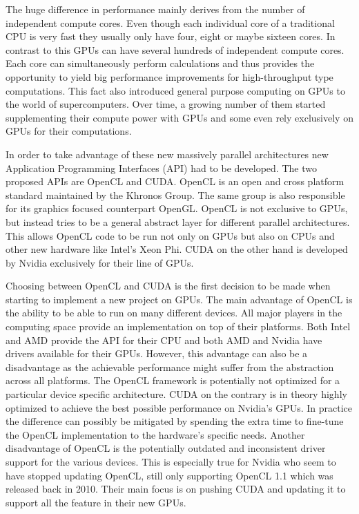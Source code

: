 \documentclass[a4paper,11pt]{kth-mag}
\begin{document}
The huge difference in performance mainly derives from the number of independent compute cores. Even though each individual core of a traditional CPU is very fast they usually only have four, eight or maybe sixteen cores. In contrast to this GPUs can have several hundreds of independent compute cores. Each core can simultaneously perform calculations and thus provides the opportunity to yield big performance improvements for high-throughput type computations. This fact also introduced general purpose computing on GPUs to the world of supercomputers. Over time, a growing number of them started supplementing their compute power with GPUs and some even rely exclusively on GPUs for their computations.

In order to take advantage of these new massively parallel architectures new Application Programming Interfaces (API) had to be developed. The two proposed APIs are OpenCL and CUDA. OpenCL is an open and cross platform standard maintained by the Khronos Group. The same group is also responsible for its graphics focused counterpart OpenGL. OpenCL is not exclusive to GPUs, but instead tries to be a general abstract layer for different parallel architectures. This allows OpenCL code to be run not only on GPUs but also on CPUs and other new hardware like Intel's Xeon Phi. CUDA on the other hand is developed by Nvidia exclusively for their line of GPUs.

Choosing between OpenCL and CUDA is the first decision to be made when starting to implement a new project on GPUs. The main advantage of OpenCL is the ability to be able to run on many different devices. All major players in the computing space provide an implementation on top of their platforms. Both Intel and AMD provide the API for their CPU and both AMD and Nvidia have drivers available for their GPUs. However, this advantage can also be a disadvantage as the achievable performance might suffer from the abstraction across all platforms. The OpenCL framework is potentially not optimized for a particular device specific architecture. CUDA on the contrary is in theory highly optimized to achieve the best possible performance on Nvidia's GPUs. In practice the difference can possibly be mitigated by spending the extra time to fine-tune the OpenCL implementation to the hardware's specific needs. Another disadvantage of OpenCL is the potentially outdated and inconsistent driver support for the various devices. This is especially true for Nvidia who seem to have stopped updating OpenCL, still only supporting OpenCL 1.1 which was released back in 2010. Their main focus is on pushing CUDA and updating it to support all the feature in their new GPUs.
\end{document}

